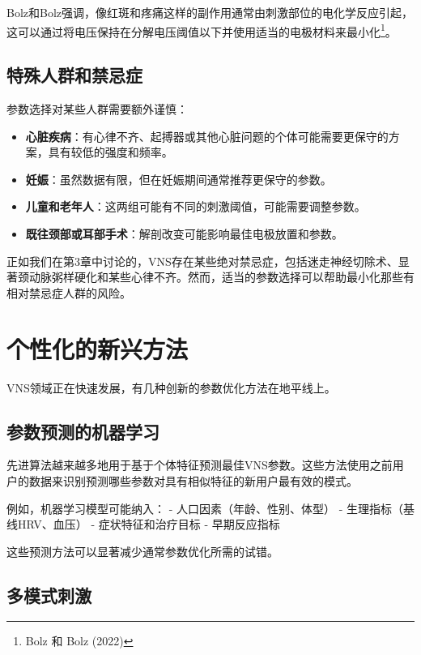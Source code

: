 \documentclass[
  Letterpaper,
]{scrbook}
\providecommand{\tightlist}{%
  \setlength{\itemsep}{0pt}\setlength{\parskip}{0pt}}\usepackage{longtable,booktabs,array}
\begin{document}
Bolz和Bolz强调，像红斑和疼痛这样的副作用通常由刺激部位的电化学反应引起，这可以通过将电压保持在分解电压阈值以下并使用适当的电极材料来最小化\footnote{Bolz
  和 Bolz (2022)}。

\subsection{特殊人群和禁忌症}\label{ux7279ux6b8aux4ebaux7fa4ux548cux7981ux5fccux75c7}

参数选择对某些人群需要额外谨慎：

\begin{itemize}
\tightlist
\item
  \textbf{心脏疾病}：有心律不齐、起搏器或其他心脏问题的个体可能需要更保守的方案，具有较低的强度和频率。
\item
  \textbf{妊娠}：虽然数据有限，但在妊娠期间通常推荐更保守的参数。
\item
  \textbf{儿童和老年人}：这两组可能有不同的刺激阈值，可能需要调整参数。
\item
  \textbf{既往颈部或耳部手术}：解剖改变可能影响最佳电极放置和参数。
\end{itemize}

正如我们在第3章中讨论的，VNS存在某些绝对禁忌症，包括迷走神经切除术、显著颈动脉粥样硬化和某些心律不齐。然而，适当的参数选择可以帮助最小化那些有相对禁忌症人群的风险。

\section{个性化的新兴方法}\label{ux4e2aux6027ux5316ux7684ux65b0ux5174ux65b9ux6cd5}

VNS领域正在快速发展，有几种创新的参数优化方法在地平线上。

\subsection{参数预测的机器学习}\label{ux53c2ux6570ux9884ux6d4bux7684ux673aux5668ux5b66ux4e60}

先进算法越来越多地用于基于个体特征预测最佳VNS参数。这些方法使用之前用户的数据来识别预测哪些参数对具有相似特征的新用户最有效的模式。

例如，机器学习模型可能纳入： - 人口因素（年龄、性别、体型） -
生理指标（基线HRV、血压） - 症状特征和治疗目标 - 早期反应指标

这些预测方法可以显著减少通常参数优化所需的试错。

\subsection{多模式刺激}\label{ux591aux6a21ux5f0fux523aux6fc0}
\end{document}
